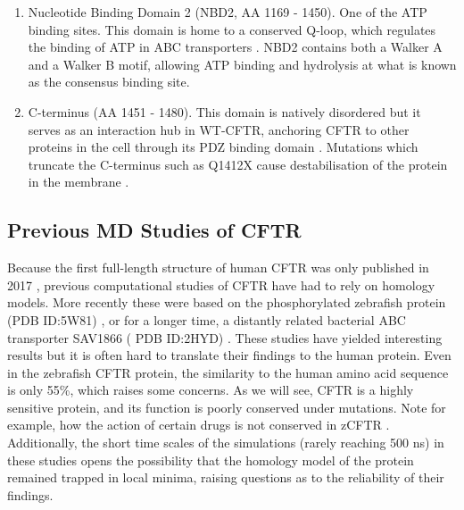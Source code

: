 \begin{enumerate}
	\item Nucleotide Binding Domain 2 (NBD2, AA 1169 - 1450). One of the ATP binding sites. This domain is home to a conserved Q-loop, which regulates the binding of ATP in ABC transporters \cite{ivey2020, zolnerciks2014, dong2015}. NBD2 contains both a Walker A and a Walker B motif, allowing ATP binding and hydrolysis at what is known as the consensus binding site. 
\item C-terminus (AA 1451 - 1480). This domain is natively disordered but it serves as an interaction hub in WT-CFTR, anchoring CFTR to other proteins in the cell through its PDZ binding domain \cite{moyer1999, cushing2008}. Mutations which truncate the C-terminus such as Q1412X cause destabilisation of the protein in the membrane \cite{yeh2019a}.

\end{enumerate}



\subsection {Previous MD Studies of CFTR}
Because the first full-length structure of human CFTR was only published in 2017 \cite{liu2017}, previous computational studies of CFTR have had to rely on homology models. More recently these were based on the phosphorylated zebrafish protein (PDB ID:5W81) \cite{zhang2017a}, or for a longer time, a distantly related bacterial ABC transporter SAV1866 ( PDB ID:2HYD) \cite{dawson2006, hoffmann2018}. These studies have yielded interesting results but it is often hard to translate their findings to the human protein. Even in the zebrafish CFTR protein, the similarity to the human amino acid sequence is only 55\%, which raises some concerns. As we will see, CFTR is a highly sensitive protein, and its function is poorly conserved under mutations. Note for example, how the action of certain drugs is not conserved in zCFTR \cite{laselva2019}. Additionally, the short time scales of the simulations (rarely reaching 500 ns) in these studies opens the possibility that the homology model of the protein remained trapped in local minima, raising questions as to the reliability of their findings.  

